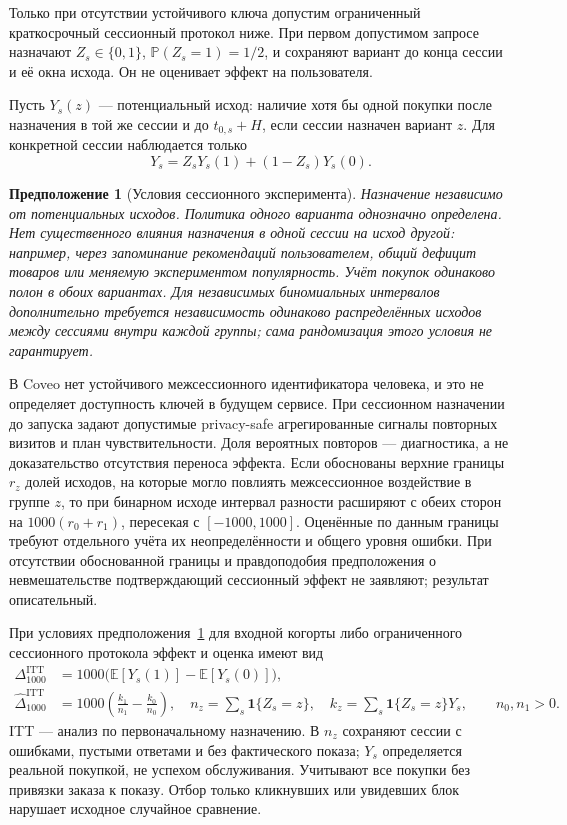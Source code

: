 \documentclass[12pt,a4paper]{article}
\newcommand{\E}{\mathbb E}
\newcommand{\Prob}{\mathbb P}
\newcommand{\ind}{\mathbf 1}
\theoremstyle{plainru}
\newtheorem{assumption}{Предположение}[section]
\begin{document}
Только при отсутствии устойчивого ключа допустим ограниченный
краткосрочный сессионный протокол ниже. При первом допустимом запросе
назначают $Z_s\in\{0,1\}$, $\Prob(Z_s=1)=1/2$, и сохраняют вариант
до конца сессии и её окна исхода. Он не оценивает эффект на пользователя.

Пусть $Y_s(z)$ --- потенциальный исход: наличие хотя бы одной покупки
после назначения в той же сессии и до $t_{0,s}+H$, если сессии назначен
вариант $z$. Для конкретной сессии наблюдается только
\begin{equation}\label{eq:eval-observed-outcome}
 Y_s=Z_sY_s(1)+(1-Z_s)Y_s(0).
\end{equation}
\begin{assumption}[Условия сессионного эксперимента]
\label{ass:eval-randomization}
Назначение независимо от потенциальных исходов.
Политика одного варианта однозначно определена.
Нет существенного влияния назначения в одной сессии на исход другой:
например, через запоминание рекомендаций пользователем, общий дефицит
товаров или меняемую экспериментом популярность.
Учёт покупок одинаково полон в обоих вариантах.
Для независимых биномиальных интервалов дополнительно требуется
независимость одинаково распределённых исходов между сессиями внутри
каждой группы; сама рандомизация этого условия не гарантирует.
\end{assumption}

В Coveo нет устойчивого межсессионного идентификатора человека, и
это не определяет доступность ключей в будущем сервисе. При сессионном
назначении до запуска задают допустимые privacy-safe агрегированные
сигналы повторных визитов и план чувствительности. Доля вероятных
повторов --- диагностика, а не доказательство отсутствия переноса эффекта.
Если обоснованы верхние границы $r_z$ долей исходов, на которые могло
повлиять межсессионное воздействие в группе $z$, то при бинарном исходе
интервал разности расширяют с обеих сторон на $1000(r_0+r_1)$,
пересекая с $[-1000,1000]$. Оценённые по данным границы требуют отдельного
учёта их неопределённости и общего уровня ошибки. При отсутствии
обоснованной границы и правдоподобия предположения о невмешательстве
подтверждающий сессионный эффект не заявляют; результат описательный.

При условиях предположения~\ref{ass:eval-randomization} для входной
когорты либо ограниченного сессионного протокола эффект и оценка имеют вид
\begin{align}
 \Delta_{1000}^{\mathrm{ITT}}
 &=1000\bigl(\E[Y_s(1)]-\E[Y_s(0)]\bigr),
 \label{eq:eval-itt-estimand}\\
 \widehat\Delta_{1000}^{\mathrm{ITT}}
 &=1000\left(\frac{k_1}{n_1}-\frac{k_0}{n_0}\right),
 \quad n_z=\sum_s\ind\{Z_s=z\},\quad
 k_z=\sum_s\ind\{Z_s=z\}Y_s,\qquad n_0,n_1>0.
 \label{eq:eval-itt-estimator}
\end{align}
ITT --- анализ по первоначальному назначению. В $n_z$ сохраняют сессии
с ошибками, пустыми ответами и без фактического показа; $Y_s$ определяется
реальной покупкой, не успехом обслуживания. Учитывают все покупки
без привязки заказа к показу. Отбор только кликнувших или увидевших
блок нарушает исходное случайное сравнение.
\end{document}
